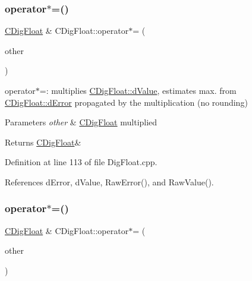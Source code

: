 \subsubsection{\texorpdfstring{operator$\ast$=()}{operator*=()}\hspace{0.1cm}{\footnotesize\ttfamily [1/2]}}
{\footnotesize\ttfamily \hyperlink{classCDigFloat}{C\+Dig\+Float} \& C\+Dig\+Float\+::operator$\ast$= (\begin{DoxyParamCaption}\item[{const \hyperlink{classCDigFloat}{C\+Dig\+Float} \&}]{other }\end{DoxyParamCaption})}



operator$\ast$=\+: multiplies \hyperlink{classCDigFloat_a4bbe69e30dd4e20527362493aa9aaf96}{C\+Dig\+Float\+::d\+Value}, estimates max. from \hyperlink{classCDigFloat_a25eb3782d1e727ff007a48f8308e3d4d}{C\+Dig\+Float\+::d\+Error} propagated by the multiplication (no rounding) 


\begin{DoxyParams}{Parameters}
{\em other} & \hyperlink{classCDigFloat}{C\+Dig\+Float} multiplied \\
\hline
\end{DoxyParams}
\begin{DoxyReturn}{Returns}
\hyperlink{classCDigFloat}{C\+Dig\+Float}\& 
\end{DoxyReturn}


Definition at line 113 of file Dig\+Float.\+cpp.



References d\+Error, d\+Value, Raw\+Error(), and Raw\+Value().

\mbox{\label{classCDigFloat_a9a01529fa684f7f5eb915b2d308578ea}} 
\subsubsection{\texorpdfstring{operator$\ast$=()}{operator*=()}\hspace{0.1cm}{\footnotesize\ttfamily [2/2]}}
{\footnotesize\ttfamily \hyperlink{classCDigFloat}{C\+Dig\+Float} \& C\+Dig\+Float\+::operator$\ast$= (\begin{DoxyParamCaption}\item[{const double}]{other }\end{DoxyParamCaption})}



